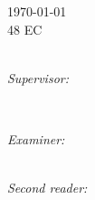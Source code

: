 \documentclass[../main.tex]{subfiles}
\begin{document}
\begin{titlepage}




	{\Large \today}\\[1cm] %



	48 EC\\ %

	\\[1cm]%






	\begin{minipage}[t]{0.4\textwidth}

		\begin{flushleft} \large

			\emph{Supervisor:} \\


		\end{flushleft}

	\end{minipage}

	~

	\begin{minipage}[t]{0.4\textwidth}

		\begin{flushright} \large

			\emph{Examiner:} \\

			\\

			\vspace{0.5cm}

			\emph{Second reader:} \\

			\\

		\end{flushright}

	\end{minipage}\\[2cm]




\end{titlepage}
\end{document}
